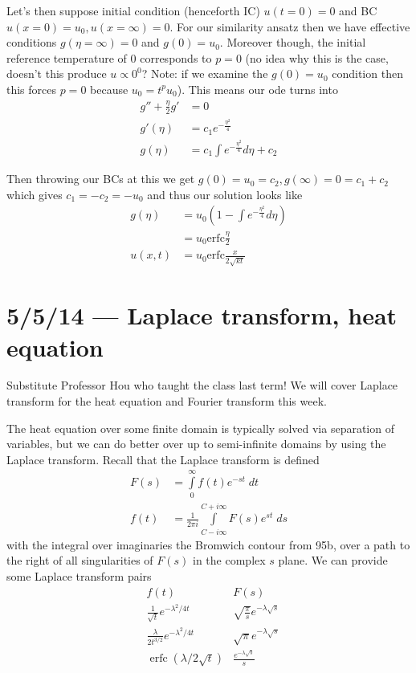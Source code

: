 \documentclass[10pt]{report}
\DeclareMathOperator{\erfc}{erfc}
\begin{document}
Let's then suppose initial condition (henceforth IC) $u(t=0) = 0$ and BC $u(x=0) = u_0, u(x=\infty) = 0$. For our similarity ansatz then we have effective conditions $g(\eta = \infty) = 0$ and $g(0) = u_0$. Moreover though, the initial reference temperature of $0$ corresponds to $p = 0$ (no idea why this is the case, doesn't this produce $u \propto 0^0$? Note: if we examine the $g(0) = u_0$ condition then this forces $p=0$ because $u_0 = t^p u_0$). This means our ode turns into
\begin{align}
    g'' + \frac{\eta}{2}g' &= 0\\
    g'(\eta) &= c_1e^{-\frac{\eta^2}{4}}\\
    g(\eta) &= c_1\int e^{-\frac{\eta^2}{4}}d\eta + c_2
\end{align}

Then throwing our BCs at this we get $g(0) = u_0 = c_2, g(\infty) = 0 = c_1 + c_2$ which gives $c_1 = -c_2 = -u_0$ and thus our solution looks like
\begin{align}
    g(\eta) &= u_0\left( 1 -  \int e^{-\frac{\eta^2}{4}}d\eta\right)\\
    &= u_0\mathrm{erfc } \frac{\eta}{2}\\
    u(x,t) &= u_0 \mathrm{erfc} \frac{x}{2\sqrt{kt}}
\end{align}
\chapter{5/5/14 --- Laplace transform, heat equation}

Substitute Professor Hou who taught the class last term! We will cover Laplace transform for the heat equation and Fourier transform this week.

The heat equation over some finite domain is typically solved via separation of variables, but we can do better over up to semi-infinite domains by using the Laplace transform. Recall that the Laplace transform is defined
\begin{align}
    F(s) &= \int\limits_{0}^{\infty}f(t)e^{-st}\;dt\\
    f(t) &= \frac{1}{2\pi i}\int\limits_{C -i\infty}^{C + i\infty}F(s) e^{st}\; ds
\end{align}
with the integral over imaginaries the Bromwich contour from 95b, over a path to the right of all singularities of $F(s)$ in the complex $s$ plane. We can provide some Laplace transform pairs
\begin{align}
    &f(t) & F(s)\nonumber\\
    &\frac{1}{\sqrt{t}}e^{-\lambda^2/4t} & \sqrt{\frac{\pi}{s}}e^{-\lambda\sqrt{s}}\\
    &\frac{\lambda}{2t^{3/2}}e^{-\lambda^2/4t} & \sqrt{\pi} e^{-\lambda \sqrt{s}}\\
    &\erfc(\lambda/2\sqrt{t}) & \frac{e^{-\lambda \sqrt{s}}}{s}
\end{align}
\end{document}

